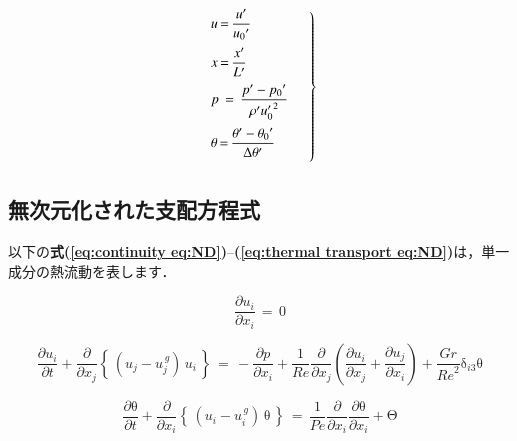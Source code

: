 \begin{equation}
\left.{ \begin{array}{l}
\vspace{2mm}
{u \,{=}\, \displaystyle{ \frac{ u^{\prime} } { {u_{0}}^{\prime}} } }\\
\vspace{2mm}
x \,{=}\, \displaystyle{ \frac{x^{\prime}}{L^{\prime}} }\\
\vspace{2mm}
p \,=\, \displaystyle{ \frac{p^\prime - {p_0}^\prime}{\rho^\prime {u_0^\prime}^2} }\\
\vspace{2mm}
\theta \,{=}\, \displaystyle{ \frac{\theta^{\prime} - {\theta_{0}}^{\prime}}{\Delta \theta^{\prime}} }
\end{array}\quad }\right\}
\label{eq:non dimensional basis}
\end{equation}

%
\subsection{無次元化された支配方程式}
\label{sec:natural_convection}
以下の\textbf{式(\ref{eq:continuity eq:ND})}--\textbf{(\ref{eq:thermal transport eq:ND})}は，単一成分の熱流動を表します．

\begin{equation}
\frac{\partial{u}_{i}}{\partial{x}_{i}}\,{=}\,{0}
\label{eq:continuity eq:ND}
\end{equation}

\begin{equation}
\frac{\partial{u}_{i}}{\partial{t}}{+}\frac{\partial}{\partial{x}_{j}} \left\{ \, \left( u_j - u_j^{\,g} \right) \, u_i \, \right\}
\,{=}\,
{-}\frac{\partial{p}}{\partial{x}_{i}}{+}\frac{1}{Re}\frac{\partial}{\partial{x}_{j}}\left({\frac{\partial{u}_{i}}{\partial{x}_{j}}{+}\frac{\partial{u}_{j}}{\partial{x}_{i}}}\right){+}\frac{Gr}{{Re}^{2}}{\mathrm{\delta}}_{i3}\mathrm{\theta}
\label{eq:NS eq:ND}
\end{equation}

\begin{equation}
\frac{\partial\mathrm{\theta}}{\partial{t}}{+}\frac{\partial}{\partial{x}_{i}} \left\{ \, \left( u_i - u_i^{\,g} \right) \, \mathrm{\theta} \, \right\}
\,{=}\,
\frac{1}{Pe}\frac{\partial}{\partial{x}_{i}}\frac{\partial\mathrm{\theta}}{\partial{x}_{i}}{+}\mathrm{\Theta}
\label{eq:thermal transport eq:ND}
\end{equation}

